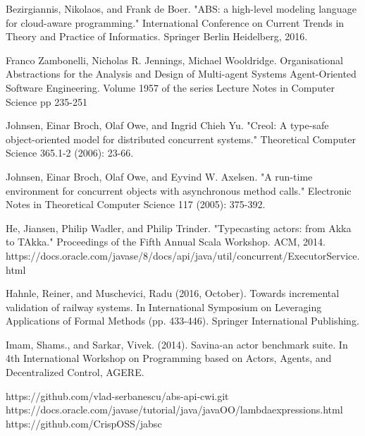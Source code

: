 \documentclass[sigplan,10pt,review,anonymous]{acmart}\settopmatter{printfolios=true}
\begin{document}
\begin{thebibliography}{4}
	 Bezirgiannis, Nikolaos, and Frank de Boer. "ABS: a high-level modeling language for cloud-aware programming." International Conference on Current Trends in Theory and Practice of Informatics. Springer Berlin Heidelberg, 2016.
	
	Franco Zambonelli, Nicholas R. Jennings, Michael Wooldridge. 
	Organisational Abstractions for the Analysis and Design of Multi-agent Systems
	Agent-Oriented Software Engineering. Volume 1957 of the series Lecture Notes in Computer Science pp 235-251
	
	 Johnsen, Einar Broch, Olaf Owe, and Ingrid Chieh Yu. "Creol: A type-safe object-oriented model for distributed concurrent systems." Theoretical Computer Science 365.1-2 (2006): 23-66.
	
	 Johnsen, Einar Broch, Olaf Owe, and Eyvind W. Axelsen. "A run-time environment for concurrent objects with asynchronous method calls." Electronic Notes in Theoretical Computer Science 117 (2005): 375-392.
	
	 He, Jiansen, Philip Wadler, and Philip Trinder. "Typecasting actors: from Akka to TAkka." Proceedings of the Fifth Annual Scala Workshop. ACM, 2014.
	 https://docs.oracle.com/javase/8/docs/api/java/util/concurrent/ExecutorService.html
	
	Hahnle, Reiner, and Muschevici, Radu (2016, October). Towards incremental validation of railway systems. In International Symposium on Leveraging Applications of Formal Methods (pp. 433-446). Springer International Publishing.
	
	 Imam, Shams., and Sarkar, Vivek. (2014). Savina-an actor benchmark suite. In 4th International Workshop on Programming based on Actors, Agents, and Decentralized Control, AGERE.
	
	https://github.com/vlad-serbanescu/abs-api-cwi.git
	 https://docs.oracle.com/javase/tutorial/java/javaOO/lambdaexpressions.html
	 https://github.com/CrispOSS/jabsc
\end{thebibliography}
%


\end{document}
